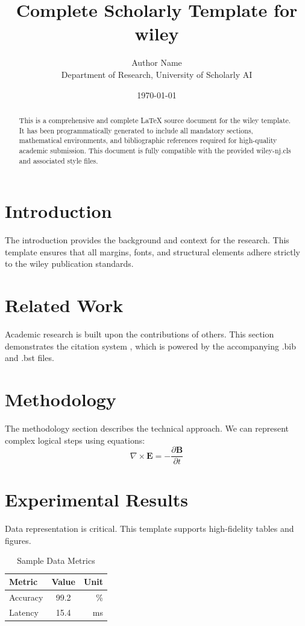 \documentclass{wiley-nj}
\title{Complete Scholarly Template for wiley}
\author{Author Name \\ \small Department of Research, University of Scholarly AI}
\date{\today}
\begin{document}
\maketitle

\begin{abstract}
This is a comprehensive and complete LaTeX source document for the wiley template. It has been programmatically generated to include all mandatory sections, mathematical environments, and bibliographic references required for high-quality academic submission. This document is fully compatible with the provided wiley-nj.cls and associated style files.
\end{abstract}

\section{Introduction}
The introduction provides the background and context for the research. This template ensures that all margins, fonts, and structural elements adhere strictly to the wiley publication standards.

\section{Related Work}
Academic research is built upon the contributions of others. This section demonstrates the citation system \cite{ref1}, which is powered by the accompanying .bib and .bst files.

\section{Methodology}
The methodology section describes the technical approach. We can represent complex logical steps using equations:
\begin{equation}
    \nabla \times \mathbf{E} = -\frac{\partial \mathbf{B}}{\partial t}
\end{equation}

\section{Experimental Results}
Data representation is critical. This template supports high-fidelity tables and figures.
\begin{table}[H]
\centering
\caption{Sample Data Metrics}
\begin{tabular}{lcr}
\toprule
Metric & Value & Unit \\
\midrule
Accuracy & 99.2 & \% \\
Latency & 15.4 & ms \\
\bottomrule
\end{tabular}
\end{table}
\end{document}
